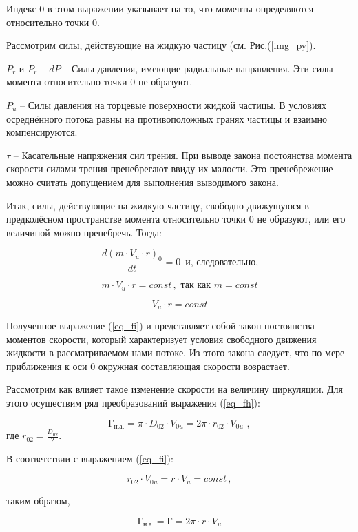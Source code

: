 \vspace{0.5 cm}
 
Индекс 0 в этом выражении указывает на то, что моменты определяются относительно точки 0.

Рассмотрим силы, действующие на жидкую частицу (см. Рис.(\ref{img_py}).

$ P_r$ и $ P_r + dP $ -- Силы давления, имеющие радиальные направления. Эти силы момента относительно точки 0 не образуют.

$ P_u $ -- Силы давления на торцевые поверхности жидкой частицы. В условиях осреднённого потока равны на противоположных гранях частицы и взаимно компенсируются.

$ \tau $ -- Касательные напряжения сил трения. При выводе закона постоянства момента скорости силами трения пренебрегают ввиду их малости. Это пренебрежение можно считать допущением для выполнения выводимого закона.

Итак, силы, действующие на жидкую частицу, свободно движущуюся в предколёсном пространстве момента относительно точки 0 не образуют, или его величиной можно пренебречь. Тогда:

$$
   \frac{d(m \cdot V_u \cdot r)_0}{dt} = 0 \,  \text{ и, следовательно,}
$$

$$
   m \cdot V_u \cdot r = const \, , \text{ так как } m = const
$$

\begin{equation}
\label{eq_fi}
   V_u \cdot r = const
\end{equation}

Полученное выражение (\ref{eq_fi}) и представляет собой закон постоянства моментов скорости, который характеризует условия свободного движения жидкости в рассматриваемом нами потоке. Из этого закона следует, что по мере приближения к оси 0 окружная составляющая скорости возрастает.

Рассмотрим как влияет такое изменение скорости на величину циркуляции. Для этого осуществим ряд преобразований выражения (\ref{eq_fh}):

$$
   \text{Г}_{\text{н.а.}} = \pi \cdot D_{02} \cdot V_{0u} = 2 \pi \cdot r_{02} \cdot V_{0u}\, \, ,
$$
где $r_{02} = \frac{D_{02}}{2}$.

В соответствии с выражением (\ref{eq_fi}):

$$
   r_{02} \cdot V_{0u} = r \cdot V_u = const \, ,
$$

таким образом,

$$
   \text{Г}_{\text{н.а.}} = \text{Г} = 2 \pi \cdot r \cdot V_u 
$$

